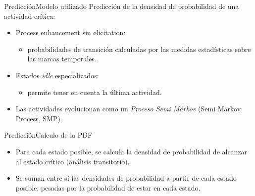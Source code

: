 \documentclass[9pt, handout]{beamer}
\begin{document}
      \begin{frame}{Predicción}{Modelo utilizado}
        \pause
        Predicción de la densidad de probabilidad de una actividad crítica:
        \pause
        \begin{itemize}
          \item Process enhancement sin elicitation:
          \begin{itemize}
            \item probabilidades de transición calculadas por las medidas estadísticas sobre las marcas temporales.
          \end{itemize}
          \pause
          \item Estados \textit{idle} especializados:
          \begin{itemize}
            \item permite tener en cuenta la última actividad.
          \end{itemize}
          \pause
          \item Las actividades evolucionan como un \textit{Proceso Semi Márkov} (Semi Markov Process, SMP).
        \end{itemize}
        
        \pause
      \end{frame}
      
      \begin{frame}{Predicción}{Calculo de la PDF}
        \pause
        \vspace{-1em}
        
      	\pause
      	\begin{itemize}
        	\item Para cada estado posible, se calcula la densidad de probabilidad de alcanzar al estado crítico (análisis transitorio).
        	\pause
        	\item Se suman entre sí las densidades de probabilidad a partir de cada estado posible, pesadas por la probabilidad de estar en cada estado.
      	\end{itemize}
      	
      	\pause
      	\vspace{-1em}
      \end{frame}
      
\end{document}

